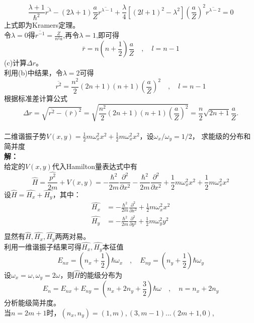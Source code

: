 \documentclass[a4paper]{article}
\newcommand{\dis}{\displaystyle}
\begin{document}
\begin{CJK*}{UTF8}{song}
{    $$\frac{\lambda +1}{\hbar^{2}}\overline{r^{\lambda}}
        -(2\lambda +1)\frac{a}{Z}\overline{r^{\lambda-1}}
        +\frac{\lambda}{4}[(2l+1)^{2}-\lambda^{2}](\frac{a}{Z})^{2}
        \overline{r^{\lambda-2}}=0$$
    上式即为Kramers定理。\\
    令$\lambda=0$得$\overline{r^{-1}}=\frac{Z}{n^{2}a}$,再令$\lambda=1$,即可得
    $$\bar{r}=n(n+\frac{1}{2})\frac{a}{Z}\quad,\quad l=n-1$$
    (c)计算$\Delta r$。\\
    利用(b)中结果，令$\lambda =2$可得
    $$\overline{r^{2}}=\frac{n^{2}}{2}(2 n+1)(n+1)(\frac{a}{Z})^{2}
        \quad,\quad l=n-1$$
    根据标准差计算公式
    $$\Delta r = \sqrt{\overline{r^{2}} - (\bar{r})^{2}}
        =\sqrt{\frac{n^{2}}{2}(2 n+1)(n+1)(\frac{a}{Z})^{2}}
        =\frac{n}{2}\sqrt{2 n+1}\frac{a}{Z}.$$
    }\\[20pt]
     二维谐振子势$\dis V(x,y)=\frac{1}{2}m\omega_{x}^{2}x^{2}
        +\frac{1}{2}m\omega_{x}^{2}x^{2}$，设$\omega_{x}/\omega_{y}=1/2$，
        求能级的分布和简并度\\[8pt]
    \textbf{解：}\\[5pt]
    {
    给定的$V(x,y)$代入Hamilton量表达式中有
    $$\hat{H}=\frac{\hat{p^{2}}}{2m}+V(x,y)
        =-\frac{\hbar^{2}}{2 m}\frac{\partial^{2}}{\partial x^{2}}
        -\frac{\hbar^{2}}{2 m}\frac{\partial^{2}}{\partial x^{2}}
        +\frac{1}{2}m\omega_{x}^{2}x^{2}+\frac{1}{2}m\omega_{x}^{2}x^{2}$$
    设$\hat{H}=\hat{H_{x}}+\hat{H_{y}}$，其中：
    \begin{equation*}\begin{split}
    \hat{H_{x}} & =  -\frac{\hbar^{2}}{2 m}\frac{\partial^{2}}{\partial x^{2}}
        + \frac{1}{2}m\omega_{x}^{2}x^{2}\\
    \hat{H_{y}} & =  -\frac{\hbar^{2}}{2 m}\frac{\partial^{2}}{\partial y^{2}}
        + \frac{1}{2}m\omega_{y}^{2}y^{2}\\        
    \end{split}\end{equation*}
    显然有$\hat{H},\hat{H_{x}},\hat{H_{y}}$两两对易。\\
    利用一维谐振子结果可得$\hat{H_{x}},\hat{H_{y}}$本征值
    $$E_{n x}=(n_{x}+\frac{1}{2})\hbar\omega_{x}
        \quad,\quad E_{n y}=(n_{y}+\frac{1}{2})\hbar\omega_{y}$$
    设$\omega_{x}=\omega,\omega_{y}=2\omega$，则$\hat{H}$的能级分布为
    $$E_{n}=E_{n x}+E_{n y}=(n_{x}+2 n_{y} + \frac{3}{2})\hbar\omega
        \quad,\quad n = n_{x}+2 n_{y}$$
    分析能级简并度。\\
    当$n=2m+1$时，$(n_{x},n_{y})=(1,m),(3,m-1)...(2 m+1,0)$,
}
\end{CJK*}
\end{document}
